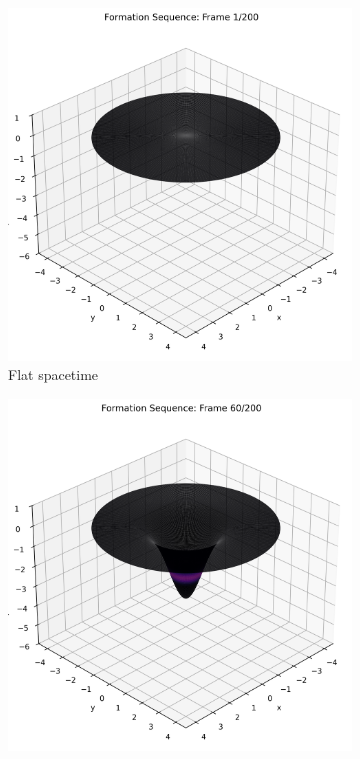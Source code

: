 \documentclass[12pt]{article}
\begin{document}
\begin{figure}[H]
  \centering
  \begin{subfigure}[b]{0.3\textwidth}
    \includegraphics[width=\textwidth]{frame_001.png}
    \caption{Flat spacetime}
  \end{subfigure}
  \hfill
  \begin{subfigure}[b]{0.3\textwidth}
    \includegraphics[width=\textwidth]{frame_060.png}

\end{subfigure}
\end{figure}
\end{document}
